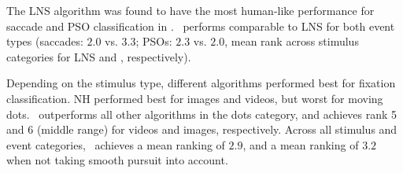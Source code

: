 The LNS algorithm \citep{Larsson2013} was found to have the most human-like
performance for saccade and PSO classification in \cite{Andersson2017}.  \remodnav\
performs comparable to LNS for both event types (saccades: $2.0$ vs. $3.3$;
PSOs: $2.3$ vs. $2.0$, mean rank across stimulus categories for LNS and \remodnav,
respectively).

Depending on the stimulus type, different algorithms performed best for
fixation classification. NH performed best for images and videos, but worst for
moving dots. \remodnav\ outperforms all other algorithms in the dots category,
and achieves rank 5 and 6 (middle range) for videos and images, respectively.
Across all stimulus and event categories, \remodnav\ achieves a mean ranking
of $2.9$, and a mean ranking of $3.2$ when not taking smooth pursuit into account.


